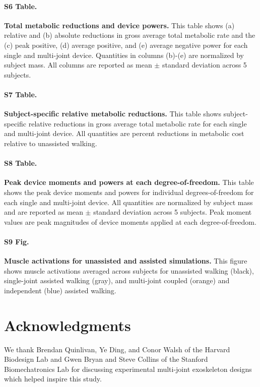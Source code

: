 \documentclass[10pt,letterpaper]{article}
\providecommand{\DIFaddbegin}{} %
\providecommand{\DIFaddend}{} %
\providecommand{\DIFdelbegin}{} %
\providecommand{\DIFdelend}{} %
\newcommand{\DIFscaledelfig}{0.5}
\newlength{\DIFdelgraphicswidth} %
\newlength{\DIFdelgraphicsheight} %
\newcommand{\DIFaddincludegraphics}[2][]{{\color{blue}\fbox{\DIFOincludegraphics[#1]{#2}}}} %
\newcommand{\DIFdelincludegraphics}[2][]{%
\sbox{\DIFdelgraphicsbox}{\DIFOincludegraphics[#1]{#2}}%
\settoboxwidth{\DIFdelgraphicswidth}{\DIFdelgraphicsbox} %
\settoboxtotalheight{\DIFdelgraphicsheight}{\DIFdelgraphicsbox} %
\scalebox{\DIFscaledelfig}{%
\parbox[b]{\DIFdelgraphicswidth}{\usebox{\DIFdelgraphicsbox}\\[-\baselineskip] \rule{\DIFdelgraphicswidth}{0em}}\llap{\resizebox{\DIFdelgraphicswidth}{\DIFdelgraphicsheight}{%
\setlength{\unitlength}{\DIFdelgraphicswidth}%
\begin{picture}(1,1)%
\thicklines\linethickness{2pt} %
{\color[rgb]{1,0,0}\put(0,0){\framebox(1,1){}}}%
{\color[rgb]{1,0,0}\put(0,0){\line( 1,1){1}}}%
{\color[rgb]{1,0,0}\put(0,1){\line(1,-1){1}}}%
\end{picture}%
}\hspace*{3pt}}} %
} %
\DeclareRobustCommand{\DIFaddbegin}{\DIFOaddbegin \let\includegraphics\DIFaddincludegraphics} %
\DeclareRobustCommand{\DIFaddend}{\DIFOaddend \let\includegraphics\DIFOincludegraphics} %
\DeclareRobustCommand{\DIFdelbegin}{\DIFOdelbegin \let\includegraphics\DIFdelincludegraphics} %
\DeclareRobustCommand{\DIFdelend}{\DIFOaddend \let\includegraphics\DIFOincludegraphics} %
\begin{document}
\paragraph*{S6 Table.}
\label{S6_Table}
{\bf Total metabolic reductions and device powers.} This table shows (a) relative and (b) absolute reductions in gross average total metabolic rate and the (c) peak positive, (d) average positive, and (e) average negative power for each single and multi-joint device. Quantities in columns (b)-(e) are normalized by subject mass. All columns are reported as mean $\pm$ standard deviation across 5 subjects.

\paragraph*{S7 Table.}
\label{S7_Table}
{\bf Subject-specific relative metabolic reductions.} This table shows subject-specific relative reductions in gross average total metabolic rate for each single and multi-joint device. All quantities are percent reductions in metabolic cost relative to unassisted walking. 

\paragraph*{S8 Table.}
\label{S8_Table}
{\bf Peak device moments and powers at each degree-of-freedom.} This table shows the peak device moments and powers for individual degrees-of-freedom for each single and multi-joint device. All quantities are normalized by subject mass and are reported as mean $\pm$ standard deviation across 5 subjects. Peak moment values are peak magnitudes of device moments applied at each degree-of-freedom.

\paragraph*{S9 Fig.}
\label{S9_Fig}
{\bf Muscle activations for unassisted and assisted simulations.} This figure shows muscle activations averaged across subjects for unassisted walking (black), single-joint assisted walking (gray), and multi-joint coupled (orange) and independent (blue) assisted walking.

\section*{Acknowledgments}
We thank Brendan Quinlivan, Ye Ding, and Conor Walsh of the Harvard Biodesign Lab and Gwen Bryan and Steve Collins of the Stanford Biomechatronics Lab for discussing experimental multi-joint exoskeleton designs which helped inspire this study. 

\nolinenumbers

\DIFdelbegin %
\DIFdelend \DIFaddbegin 
\DIFaddend 
\end{document}

